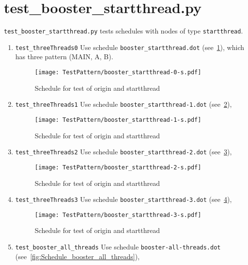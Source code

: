\documentclass[12pt,a4paper]{report}
\begin{document}
\section{test\_booster\_startthread.py}
\texttt{test\_booster\_startthread.py} tests schedules with nodes of type \texttt{startthread}.
\begin{enumerate}
\item \texttt{test\_threeThreads0}
Use schedule \texttt{booster\_startthread.dot} (see~\ref{fig:Schedule_booster_startthread-0}),
which has three pattern (MAIN, A, B).
    \begin{figure}
        \centering
        \texttt{[image: TestPattern/booster\_startthread-0-s.pdf]}
        \caption{Schedule for test of origin and startthread}
        \label{fig:Schedule_booster_startthread-0}
    \end{figure}
\item \texttt{test\_threeThreads1}
Use schedule \texttt{booster\_startthread-1.dot} (see~\ref{fig:Schedule_booster_startthread-1}), 
    \begin{figure}
        \centering
        \texttt{[image: TestPattern/booster\_startthread-1-s.pdf]}
        \caption{Schedule for test of origin and startthread}
        \label{fig:Schedule_booster_startthread-1}
    \end{figure}
\item \texttt{test\_threeThreads2}
Use schedule \texttt{booster\_startthread-2.dot} (see~\ref{fig:Schedule_booster_startthread-2}), 
    \begin{figure}
        \centering
        \texttt{[image: TestPattern/booster\_startthread-2-s.pdf]}
        \caption{Schedule for test of origin and startthread}
        \label{fig:Schedule_booster_startthread-2}
    \end{figure}
\item \texttt{test\_threeThreads3}
Use schedule \texttt{booster\_startthread-3.dot} (see~\ref{fig:Schedule_booster_startthread-3}), 
    \begin{figure}
        \centering
        \texttt{[image: TestPattern/booster\_startthread-3-s.pdf]}
        \caption{Schedule for test of origin and startthread}
        \label{fig:Schedule_booster_startthread-3}
    \end{figure}
\item \texttt{test\_booster\_all\_threads}
Use schedule \texttt{booster-all-threads.dot} (see~\ref{fig:Schedule_booster_all_threads}),

\end{enumerate}
\end{document}
